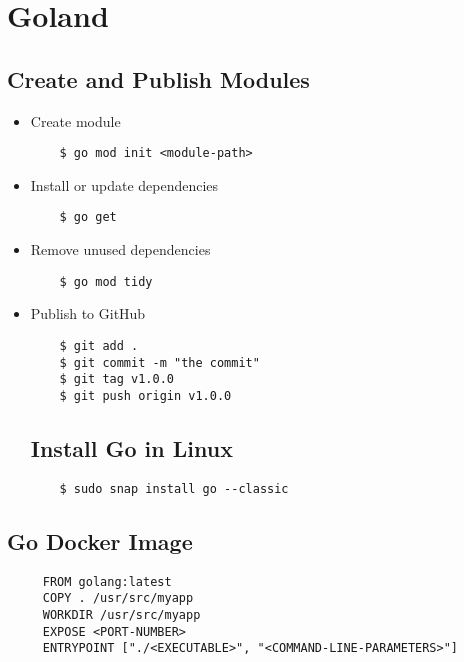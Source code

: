 \chapter{Goland}

\section{Create and Publish Modules}

\begin{itemize}
	\item Create module
	
	\begin{verbatim}
	$ go mod init <module-path>
	\end{verbatim}
	
	
	\item Install or  update dependencies
	
	\begin{verbatim}
	$ go get
	\end{verbatim}
	
	\item Remove unused dependencies
	
	\begin{verbatim}
	$ go mod tidy
	\end{verbatim}
	
	\item Publish to GitHub
	
	\begin{verbatim}
	$ git add .
	$ git commit -m "the commit"
	$ git tag v1.0.0
	$ git push origin v1.0.0
	\end{verbatim}
	
	
\section{Install Go in Linux}

	\begin{verbatim}
	$ sudo snap install go --classic
	\end{verbatim}
\end{itemize}

\section{Go Docker Image}

	\begin{verbatim}
	 FROM golang:latest
	 COPY . /usr/src/myapp
	 WORKDIR /usr/src/myapp
	 EXPOSE <PORT-NUMBER>
	 ENTRYPOINT ["./<EXECUTABLE>", "<COMMAND-LINE-PARAMETERS>"]
	\end{verbatim}
	
